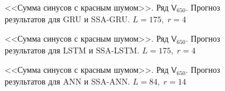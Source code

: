 \documentclass[specialist,
               substylefile = spbu.rtx,
               subf,href,colorlinks=true, 12p]{disser}
\begin{document}
\begin{figure}[H]
	\captionsetup{justification=centering}
	\caption{<<Сумма синусов с красным шумом>>. Ряд $\mathsf{V}_{650}$. Прогноз результатов для GRU и SSA-GRU. $L = 175, \; r = 4$}
	\label{serr_r4_res_gru}
\end{figure}

\begin{figure}[H]
	\captionsetup{justification=centering}
	\caption{<<Сумма синусов с красным шумом>>. Ряд $\mathsf{V}_{650}$. Прогноз результатов для LSTM и SSA-LSTM. $L = 175, \; r = 4$}
	\label{serr_r4_res_lstm}
\end{figure}

\begin{figure}[H]
	\captionsetup{justification=centering}
	\caption{<<Сумма синусов с красным шумом>>. Ряд $\mathsf{V}_{650}$. Прогноз результатов для ANN и SSA-ANN. $L = 84, \; r = 14$}
\end{figure}
\end{document}
